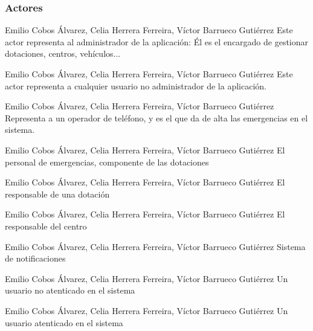 \subsubsection{Actores}

{Emilio Cobos Álvarez, Celia Herrera Ferreira, Víctor Barrueco Gutiérrez}
{}
{Este actor representa al administrador de la aplicación: Él es el encargado de gestionar dotaciones, centros, vehículos...}

{Emilio Cobos Álvarez, Celia Herrera Ferreira, Víctor Barrueco Gutiérrez}
{}
{Este actor representa a cualquier usuario no administrador de la aplicación.}

{Emilio Cobos Álvarez, Celia Herrera Ferreira, Víctor Barrueco Gutiérrez}
{}
{Representa a un operador de teléfono, y es el que da de alta las emergencias en el sistema.}

{Emilio Cobos Álvarez, Celia Herrera Ferreira, Víctor Barrueco Gutiérrez}
{}
{El personal de emergencias, componente de las dotaciones}

{Emilio Cobos Álvarez, Celia Herrera Ferreira, Víctor Barrueco Gutiérrez}
{}
{El responsable de una dotación}

{Emilio Cobos Álvarez, Celia Herrera Ferreira, Víctor Barrueco Gutiérrez}
{}
{El responsable del centro}

{Emilio Cobos Álvarez, Celia Herrera Ferreira, Víctor Barrueco Gutiérrez}
{}
{Sistema de notificaciones}

{Emilio Cobos Álvarez, Celia Herrera Ferreira, Víctor Barrueco Gutiérrez}
{}
{Un usuario no atenticado en el sistema}

{Emilio Cobos Álvarez, Celia Herrera Ferreira, Víctor Barrueco Gutiérrez}
{}
{Un usuario atenticado en el sistema}

